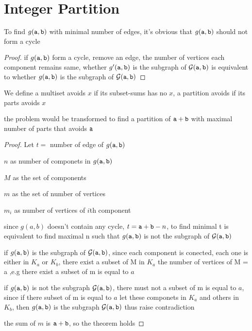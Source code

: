 \section{Integer Partition}

\noindent
To find $g(\mathtt{a},\mathtt{b})$ with minimal number of edges, it's obvious that $g(\mathtt{a} ,\mathtt{b})$ should not form a cycle

\begin{proof} 
if $g(\mathtt{a},\mathtt{b})$ form a cycle, remove an edge, the number of vertices each component remains same, whether $g'(\mathtt{a},\mathtt{b})$ is the subgraph of ${\cal G}(\mathtt{a},\mathtt{b})$ is equivalent to whether $g(\mathtt{a},\mathtt{b})$ is the subgraph of ${\cal G}(\mathtt{a},\mathtt{b})$
\end{proof}

\begin{definition}
We define a multiset avoids $x$ if its subset-sums has no $x$, a partition avoids if its parts avoids $x$
\end{definition}

\begin{theorem}

the problem would be transformed to find a partition of $\mathtt{a}+\mathtt{b}$ with  maximal number of parts that avoids $\mathtt{a}$

\end{theorem}

\begin{proof} 
Let $t =$ number of edge of $g(\mathtt{a},\mathtt{b})$

$n$ as number of componets in $g(\mathtt{a},\mathtt{b})$

$M$ as the set of components

$m$ as the set of number of vertices

$m_i$  as number of vertices of $i$th component

since $g(a,b)$ doesn't contain any cycle, $t = \mathtt{a}+\mathtt{b} - n$, to find minimal t is equivalent to find maximal n such that $g(\mathtt{a},\mathtt{b})$ is not the subgraph of ${\cal G}(\mathtt{a},\mathtt{b})$

if $g(\mathtt{a},\mathtt{b})$ is the subgraph of ${\cal G}(\mathtt{a},\mathtt{b})$, 
since each component is conected, each one is either in $K_a$ or $K_b$, there exist a subset of M in $K_a$ the number of vertices of M = a
,e.g there exist a subset of m is equal to $a$

if $g(\mathtt{a},\mathtt{b})$ is not the subgraph ${\cal G}(\mathtt{a},\mathtt{b})$, there must not a subset of m is equal to $a$, since if there subset of m is equal to $a$ let these componets in $K_a$ and others in $K_b$, then $g(\mathtt{a},\mathtt{b})$ is the subgraph ${\cal G}(\mathtt{a},\mathtt{b})$ thus raise contradiction


the sum of $m$ is $\mathtt{a}+\mathtt{b}$, so the theorem holds

\end{proof}

